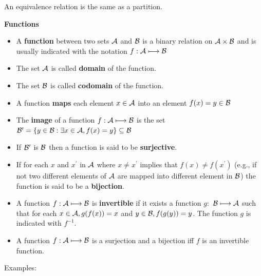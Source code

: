 \documentclass[justified, sixbynine]{tufte-book}
\def\subsubsection#1{{\bf #1}}
\theoremstyle{plain}%
\newtheorem * {corollary}{Corollary}
\theoremstyle{definition}
\theoremstyle{remark}
\newtheorem * {remark}{Remark}
\newtheorem * {note}{Note}
\begin{document}
\begin{fullwidth}
An equivalence relation is the same as a partition.

\subsubsection{Functions}

\begin{itemize}
\item  A {\bf function} between two sets ${\cal A}$ and ${\cal B}$ is a
binary relation on ${\cal A}\times {\cal B}$ and is usually indicated with
the notation $f:{\cal A}\longmapsto {\cal B}$

\item  The set ${\cal A}$ is called {\bf domain} of the function.

\item  The set ${\cal B}$ is called {\bf codomain} of the function.

\item  A function {\bf maps} each element $x\in {\cal A}$ into an element $%
f(x)=y\in {\cal B}$

\item  The {\bf image} of a function $f:{\cal A}\longmapsto {\cal B}$ is the
set ${\cal B}^{\prime }=\{y\in {\cal B}:\exists x\in {\cal A}%
, f(x)=y\}\subseteq {\cal B}$

\item  If ${\cal B}^{\prime }$ is ${\cal B}$ then a function is said to be
{\bf surjective}.

\item  If for each $x$ and $x^{\prime }$ in ${\cal A}$ where $x\neq
x^{\prime }$ implies that $f(x)\neq f(x^{\prime })$ (e.g., if not two
different elements of ${\cal A}$ are mapped into different element in ${\cal B%
}$) the function is said to be a {\bf bijection}.

\item  A function $f:{\cal A}\longmapsto {\cal B}$ is {\bf invertible} if it
exists a function $g:$ ${\cal B}\longmapsto {\cal A}$ such that for each $%
x\in {\cal A}, g(f(x))=x$ and $y\in {\cal B}, f(g(y))=y$. The function $g$ is
indicated with $f^{-1}$.

\item  A function $f:{\cal A}\longmapsto {\cal B}$ is a surjection and a
bijection iff $f$ is an invertible function.
\end{itemize}

Examples:


\end{fullwidth}
\end{document}

